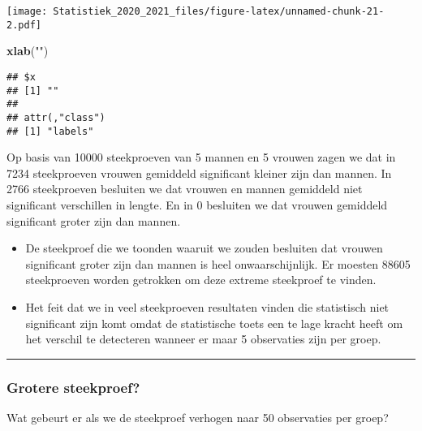 \documentclass[
  12pt,dutch,coursenotes]{book}
\newenvironment{Shaded}{\begin{snugshade}}{\end{snugshade}}
\newcommand{\KeywordTok}[1]{\textcolor[rgb]{0.13,0.29,0.53}{\textbf{#1}}}
\newcommand{\NormalTok}[1]{#1}
\newcommand{\StringTok}[1]{\textcolor[rgb]{0.31,0.60,0.02}{#1}}
\theoremstyle{definition}
\theoremstyle{definition}
\theoremstyle{definition}
\theoremstyle{remark}
\begin{document}
\texttt{[image: Statistiek\_2020\_2021\_files/figure-latex/unnamed-chunk-21-2.pdf]}

\begin{Shaded}
\begin{Highlighting}[]
\KeywordTok{xlab}\NormalTok{(}\StringTok{""}\NormalTok{)}
\end{Highlighting}
\end{Shaded}

\begin{verbatim}
## $x
## [1] ""
## 
## attr(,"class")
## [1] "labels"
\end{verbatim}

Op basis van 10000 steekproeven van 5 mannen en 5 vrouwen zagen we dat in 7234 steekproeven vrouwen gemiddeld significant kleiner zijn dan mannen. In 2766 steekproeven besluiten we dat vrouwen en mannen gemiddeld niet significant verschillen in lengte. En in 0 besluiten we dat vrouwen gemiddeld significant groter zijn dan mannen.

\begin{itemize}
\item
  De steekproef die we toonden waaruit we zouden besluiten dat vrouwen significant groter zijn dan mannen is heel onwaarschijnlijk. Er moesten 88605 steekproeven worden getrokken om deze extreme steekproef te vinden.
\item
  Het feit dat we in veel steekproeven resultaten vinden die statistisch niet significant zijn komt omdat de statistische toets een te lage kracht heeft om het verschil te detecteren wanneer er maar 5 observaties zijn per groep.
\end{itemize}

\begin{center}\rule{0.5\linewidth}{0.5pt}\end{center}

\hypertarget{grotere-steekproef}{%
\subsubsection{Grotere steekproef?}\label{grotere-steekproef}}

Wat gebeurt er als we de steekproef verhogen naar 50 observaties per groep?
\end{document}
